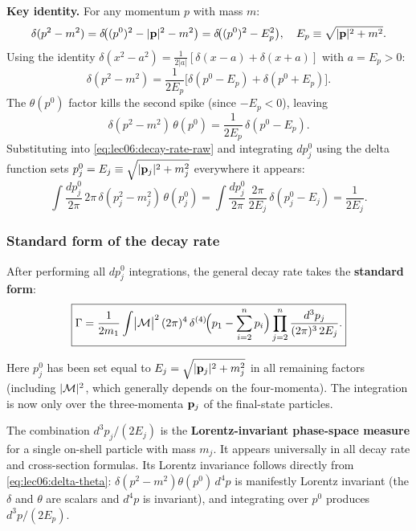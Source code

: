 \documentclass[../main.tex]{subfiles}
\begin{document}
\textbf{Key identity.}  For any momentum $p$ with mass $m$:
\begin{equation}
  \delta(p^2 - m^2)
  = \delta\!\bigl((p^0)^2 - |\mathbf{p}|^2 - m^2\bigr)
  = \delta\!\bigl((p^0)^2 - E_p^2\bigr),
  \quad E_p \equiv \sqrt{|\mathbf{p}|^2 + m^2}.
  \label{eq:lec06:delta-id1}
\end{equation}
Using the identity $\delta(x^2 - a^2) = \frac{1}{2|a|}[\delta(x-a) + \delta(x+a)]$ with $a = E_p > 0$:
\begin{equation}
  \delta(p^2 - m^2)
  = \frac{1}{2E_p}\bigl[\delta(p^0 - E_p) + \delta(p^0 + E_p)\bigr].
  \label{eq:lec06:delta-split}
\end{equation}
The $\theta(p^0)$ factor kills the second spike (since $-E_p < 0$), leaving
\begin{equation}
  \delta(p^2 - m^2)\,\theta(p^0)
  = \frac{1}{2E_p}\,\delta(p^0 - E_p).
  \label{eq:lec06:delta-theta}
\end{equation}
Substituting into \eqref{eq:lec06:decay-rate-raw} and integrating $dp_j^0$ using the delta function sets $p_j^0 = E_j \equiv \sqrt{|\mathbf{p}_j|^2 + m_j^2}$ everywhere it appears:
\begin{equation}
  \int \frac{dp_j^0}{2\pi}\, 2\pi\,\delta(p^2_j - m_j^2)\,\theta(p_j^0)
  = \int \frac{dp_j^0}{2\pi}\,\frac{2\pi}{2E_j}\,\delta(p_j^0 - E_j)
  = \frac{1}{2E_j}.
  \label{eq:lec06:p0-integral}
\end{equation}

\subsubsection*{Standard form of the decay rate}

After performing all $dp_j^0$ integrations, the general decay rate takes the \textbf{standard form}:
\begin{equation}
  \boxed{
  \Gamma
  = \frac{1}{2m_1}
    \int \bigl|\mathcal{M}\bigr|^2\,
    (2\pi)^4\,\delta^{(4)}\!\Bigl(p_1 - \sum_{i=2}^{n} p_i\Bigr)
    \prod_{j=2}^{n}
    \frac{d^3p_j}{(2\pi)^3\,2E_j}.
  }
  \label{eq:lec06:decay-rate-standard}
\end{equation}

Here $p_j^0$ has been set equal to $E_j = \sqrt{|\mathbf{p}_j|^2 + m_j^2}$ in all remaining factors (including $|\mathcal{M}|^2$, which generally depends on the four-momenta).  The integration is now only over the three-momenta $\mathbf{p}_j$ of the final-state particles.

\begin{remark}
The combination $d^3p_j/(2E_j)$ is the \textbf{Lorentz-invariant phase-space measure} for a single on-shell particle with mass $m_j$.  It appears universally in all decay rate and cross-section formulas.  Its Lorentz invariance follows directly from \eqref{eq:lec06:delta-theta}: $\delta(p^2-m^2)\theta(p^0)\,d^4p$ is manifestly Lorentz invariant (the $\delta$ and $\theta$ are scalars and $d^4p$ is invariant), and integrating over $p^0$ produces $d^3p/(2E_p)$.
\end{remark}
\end{document}
